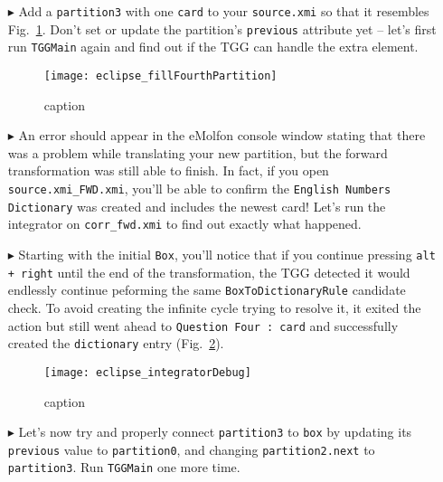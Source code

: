 \begin{itemize}

\item[$\blacktriangleright$] Add a \texttt{partition3} with one \texttt{card} to your \texttt{source.xmi} so that it resembles
Fig.~\ref{fig:fourthPartitionStart}. Don't set or update the partition's \texttt{previous} attribute yet -- let's first run \texttt{TGGMain} again and find out
if the TGG can handle the extra element.

\begin{figure}[htbp]
\begin{center}
  \texttt{[image: eclipse\_fillFourthPartition]}
  \caption{caption}
  \label{fig:fourthPartitionStart}
\end{center}
\end{figure}

\item[$\blacktriangleright$] An error should appear in the eMolfon console window stating that there was a problem while translating your new partition, but the
forward transformation was still able to finish. In fact, if you open \texttt{source.xmi\_FWD.xmi}, you'll be able to confirm the \texttt{English Numbers
Dictionary} was created and includes the newest card! Let's run the integrator on \texttt{corr\_fwd.xmi} to find out exactly what happened.

\item[$\blacktriangleright$] Starting with the initial \texttt{Box}, you'll notice that if you continue pressing \texttt{alt + right} until the end of the
transformation, the TGG detected it would endlessly continue peforming the same \texttt{BoxToDictionaryRule} candidate check. To avoid creating the infinite
cycle trying to resolve it, it exited the action but still went ahead to \texttt{Question Four : card} and successfully created the \texttt{dictionary} entry
(Fig.~\ref{fig:integrator_debugSuccess}).

\begin{figure}[htb]
\begin{center}
  \texttt{[image: eclipse\_integratorDebug]}
  \caption{caption}
  \label{fig:integrator_debugSuccess}
\end{center}
\end{figure}

\item[$\blacktriangleright$] Let's now try and properly connect \texttt{partition3} to \texttt{box} by updating its \texttt{previous} value to
\texttt{partition0}, and changing \texttt{partition2.next} to \texttt{partition3}. Run \texttt{TGGMain} one more time.


\end{itemize}
